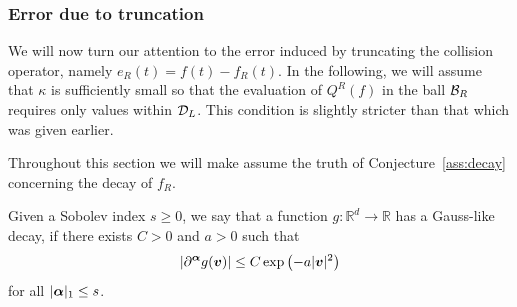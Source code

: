 \subsubsection{Error due to truncation} \label{sec:err-trunc}

We will now turn our attention to the error induced by truncating the collision
operator, namely $e_R(t) = f(t) - f_R(t)$. In the following, we will assume
that $\kappa$ is sufficiently small so that the evaluation of $Q^R(f)$ in the
ball $\mathcal{B}_R$ requires only values within $\mathcal{D}_L$. This condition is slightly
stricter than that which was given earlier.

Throughout this section we will make assume the truth of Conjecture~\ref{ass:decay} concerning the decay of
$f_R$.

\begin{definition}
    \label{def:gd}
    Given a Sobolev index $s\geq 0$, we say that a function
    $g:\mathbb{R}^{d}\to\mathbb{R}$ has a Gauss-like decay, if there
    exists $C>0$ and $a>0$ such that 
    $$
        |\partial^{\bm\alpha} g({\bm v})| \le C\exp\left(-a|{\bm v}|^2\right)
    $$
    for all $|{\bm\alpha}|_1 \leq s$.
\end{definition}

